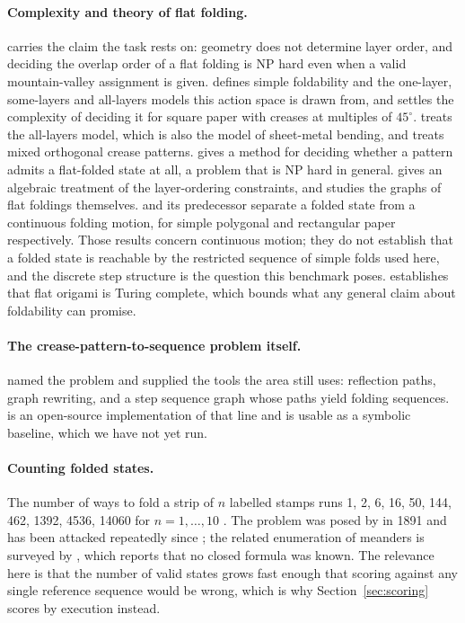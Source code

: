 \paragraph{Complexity and theory of flat folding.}
\citet{bern-hayes} carries the claim the task rests on: geometry does not determine layer order,
and deciding the overlap order of a flat folding is NP hard even when a valid mountain-valley
assignment is given. \citet{arkin-map} defines simple foldability and the one-layer, some-layers
and all-layers models this action space is drawn from, and \citet{akitaya-hard} settles the
complexity of deciding it for square paper with creases at multiples of $45^\circ$.
\citet{akitaya-infinite} treats the all-layers model, which is also the model of sheet-metal
bending, and \citet{mixed-orthogonal} treats mixed orthogonal crease patterns.
\citet{akitaya-flatfolder} gives a method for deciding whether a pattern admits a flat-folded
state at all, a problem that is NP hard in general. \citet{layer-algebra} gives an algebraic
treatment of the layer-ordering constraints, and \citet{flat-folding-graphs} studies the graphs of
flat foldings themselves. \citet{continuous} and its predecessor \citet{reaching-folded} separate a
folded state from a continuous folding motion, for simple polygonal and rectangular paper
respectively. Those results concern continuous motion; they do not establish that a folded state
is reachable by the restricted sequence of simple folds used here, and the discrete step structure
is the question this benchmark poses. \citet{turing} establishes that flat origami is Turing
complete, which bounds what any general claim about foldability can promise.

\paragraph{The crease-pattern-to-sequence problem itself.}
\citet{akitaya-cp2seq} named the problem and supplied the tools the area still uses: reflection
paths, graph rewriting, and a step sequence graph whose paths yield folding sequences.
\citet{creasy} is an open-source implementation of that line and is usable as a symbolic baseline,
which we have not yet run.

\paragraph{Counting folded states.}
The number of ways to fold a strip of $n$ labelled stamps runs 1, 2, 6, 16, 50, 144, 462, 1392,
4536, 14060 for $n=1,\ldots,10$ \citep{oeis-a000136}. The problem was posed by \citet{lucas} in
1891 and has been attacked repeatedly since \citep{koehler,lunnon}; the related enumeration of
meanders is surveyed by \citet{meanders}, which reports that no closed formula was known. The
relevance here is that the number of valid states grows fast enough that scoring against any
single reference sequence would be wrong, which is why Section~\ref{sec:scoring} scores by
execution instead.

